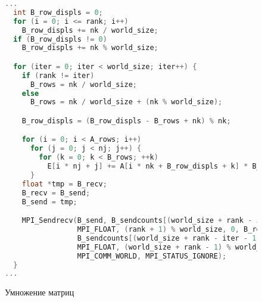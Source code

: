\documentclass[12pt, oneside, a4paper]{article}
\begin{document}
\begin{figure}[h]
\begin{lstlisting}[language=C++]
...
  int B_row_displs = 0;
  for (i = 0; i <= rank; i++)
    B_row_displs += nk / world_size;
  if (B_row_displs != 0)
    B_row_displs += nk % world_size;

  for (iter = 0; iter < world_size; iter++) {
    if (rank != iter)
      B_rows = nk / world_size;
    else
      B_rows = nk / world_size + (nk % world_size);

    B_row_displs = (B_row_displs - B_rows + nk) % nk;

    for (i = 0; i < A_rows; i++)
      for (j = 0; j < nj; j++) {
        for (k = 0; k < B_rows; ++k)
          E[i * nj + j] += A[i * nk + B_row_displs + k] * B_recv[k * nj + j];
      }
    float *tmp = B_recv;
    B_recv = B_send;
    B_send = tmp;

    MPI_Sendrecv(B_send, B_sendcounts[(world_size + rank - iter) % world_size],
                 MPI_FLOAT, (rank + 1) % world_size, 0, B_recv,
                 B_sendcounts[(world_size + rank - iter - 1) % world_size],
                 MPI_FLOAT, (world_size + rank - 1) % world_size, 0,
                 MPI_COMM_WORLD, MPI_STATUS_IGNORE);
  }
...
\end{lstlisting}
\caption{Умножение матриц}
\end{figure}
\end{document}
